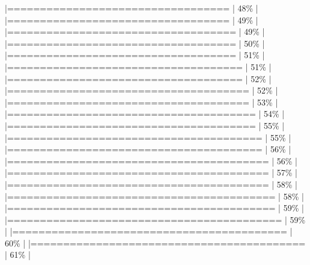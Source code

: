 \documentclass[
]{article}
\newenvironment{Shaded}{}{}
\begin{document}
\begin{Shaded}
\begin{Highlighting}[]
|==================================                                    |  48\%  |                                                                              |==================================                                    |  49\%  |                                                                              |===================================                                   |  49\%  |                                                                              |===================================                                   |  50\%  |                                                                              |===================================                                   |  51\%  |                                                                              |====================================                                  |  51\%  |                                                                              |====================================                                  |  52\%  |                                                                              |=====================================                                 |  52\%  |                                                                              |=====================================                                 |  53\%  |                                                                              |======================================                                |  54\%  |                                                                              |======================================                                |  55\%  |                                                                              |=======================================                               |  55\%  |                                                                              |=======================================                               |  56\%  |                                                                              |========================================                              |  56\%  |                                                                              |========================================                              |  57\%  |                                                                              |========================================                              |  58\%  |                                                                              |=========================================                             |  58\%  |                                                                              |=========================================                             |  59\%  |                                                                              |==========================================                            |  59\%  |                                                                              |==========================================                            |  60\%  |                                                                              |==========================================                            |  61\%  |                                     
\end{Highlighting}
\end{Shaded}
\end{document}
